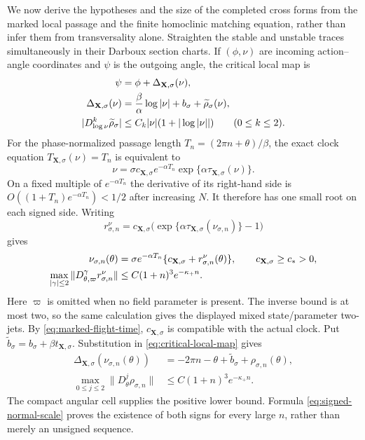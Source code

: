 \documentclass[11pt]{amsart}
\numberwithin{equation}{section}
\theoremstyle{definition}
\theoremstyle{remark}
\begin{document}
We now derive the hypotheses and the size of the completed cross forms from
the marked local passage and the finite homoclinic matching equation, rather than infer
them from transversality alone.  Straighten the stable and unstable traces
simultaneously in their Darboux section charts.
If $(\phi,\nu)$ are incoming action--angle coordinates and $\psi$ is the
outgoing angle, the critical local map is
\begin{align}
 \psi&=\phi+\Delta_{\mathbf X,\sigma}(\nu),\notag\\
 \Delta_{\mathbf X,\sigma}(\nu)
 &=\frac{\beta}{\alpha}\log|\nu|+b_\sigma
   +\widetilde\rho_\sigma(\nu),\label{eq:critical-local-map}\\
 |D_{\log\nu}^k\widetilde\rho_\sigma|
 &\le C_k|\nu|(1+|\log|\nu||)
       \qquad(0\le k\le2).\notag
\end{align}
For the phase-normalized passage length
$T_n=(2\pi n+\theta)/\beta$, the exact clock equation
$T_{\mathbf X,\sigma}(\nu)=T_n$ is equivalent to
\begin{equation}\label{eq:marked-time-inversion}
 \nu=\sigma c_{\mathbf X,\sigma}e^{-\alpha T_n}
       \exp\{\alpha\tau_{\mathbf X,\sigma}(\nu)\}.
\end{equation}
On a fixed multiple of $e^{-\alpha T_n}$ the derivative of its right-hand
side is $O((1+T_n)e^{-\alpha T_n})<1/2$ after increasing $N$.  It therefore
has one small root on each signed side.  Writing
\[
 r^\nu_{\sigma,n}
 =c_{\mathbf X,\sigma}
   \bigl(\exp\{\alpha\tau_{\mathbf X,\sigma}
          (\nu_{\sigma,n})\}-1\bigr)
\]
gives
\begin{align}
 \nu_{\sigma,n}(\theta)
 &=\sigma e^{-\alpha T_n}
   \{c_{\mathbf X,\sigma}+r^\nu_{\sigma,n}(\theta)\},
   \qquad c_{\mathbf X,\sigma}\ge c_*>0,
   \label{eq:signed-normal-scale}\\
 \max_{|\gamma|\le2}\|D_{\theta,\varpi}^\gamma r^\nu_{\sigma,n}\|
 &\le C(1+n)^3e^{-\kappa_+n}.
 \notag
\end{align}
Here $\varpi$ is omitted when no field parameter is present.  The inverse bound
is at most two, so the same calculation gives the displayed mixed
state/parameter two-jets.  By
\eqref{eq:marked-flight-time}, $c_{\mathbf X,\sigma}$ is compatible with
the actual clock.  Put
$\widetilde b_\sigma=b_\sigma+\beta t_{\mathbf X,\sigma}$.
Substitution in
\eqref{eq:critical-local-map} gives
\begin{equation}\label{eq:lifted-log-phase}
 \begin{aligned}
  \Delta_{\mathbf X,\sigma}(\nu_{\sigma,n}(\theta))
  &=-2\pi n-\theta+\widetilde b_\sigma
    +\rho_{\sigma,n}(\theta),\\
  \max_{0\le j\le2}\|D_\theta^j\rho_{\sigma,n}\|
  &\le C(1+n)^3e^{-\kappa_+n}.
 \end{aligned}
\end{equation}
The compact angular cell supplies the positive lower bound.  Formula
\eqref{eq:signed-normal-scale} proves the existence of both signs for every
large $n$, rather than merely an unsigned sequence.
\end{document}
